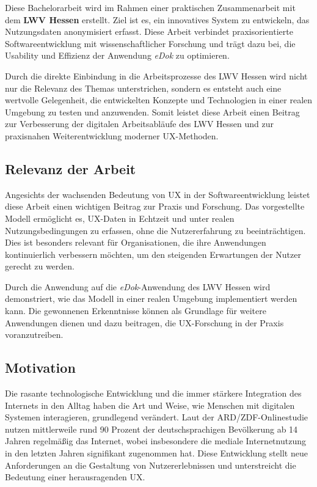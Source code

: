 \documentclass[12pt,oneside]{article}
\begin{document}
Diese Bachelorarbeit wird im Rahmen einer praktischen Zusammenarbeit mit dem \textbf{LWV Hessen} erstellt. Ziel ist es, ein innovatives System zu entwickeln, das Nutzungsdaten anonymisiert erfasst.
Diese Arbeit verbindet praxisorientierte Softwareentwicklung mit wissenschaftlicher Forschung und trägt dazu bei, die Usability und Effizienz der Anwendung \textit{eDok} zu optimieren.

Durch die direkte Einbindung in die Arbeitsprozesse des LWV Hessen wird nicht nur die Relevanz des Themas unterstrichen, sondern es entsteht auch eine wertvolle Gelegenheit, die entwickelten Konzepte und Technologien in einer realen Umgebung zu testen und anzuwenden. Somit leistet diese Arbeit einen Beitrag zur Verbesserung der digitalen Arbeitsabläufe des LWV Hessen und zur praxisnahen Weiterentwicklung moderner UX-Methoden.
\subsection{Relevanz der Arbeit}

Angesichts der wachsenden Bedeutung von UX in der Softwareentwicklung leistet diese Arbeit einen wichtigen Beitrag zur Praxis und Forschung. Das vorgestellte Modell ermöglicht es, UX-Daten in Echtzeit und unter realen Nutzungsbedingungen zu erfassen, ohne die Nutzererfahrung zu beeinträchtigen. Dies ist besonders relevant für Organisationen, die ihre Anwendungen kontinuierlich verbessern möchten, um den steigenden Erwartungen der Nutzer gerecht zu werden.

Durch die Anwendung auf die \textit{eDok}-Anwendung des LWV Hessen wird demonstriert, wie das Modell in einer realen Umgebung implementiert werden kann. Die gewonnenen Erkenntnisse können als Grundlage für weitere Anwendungen dienen und dazu beitragen, die UX-Forschung in der Praxis voranzutreiben.
\subsection{Motivation}

Die rasante technologische Entwicklung und die immer stärkere Integration des Internets in den Alltag haben die Art und Weise, wie Menschen mit digitalen Systemen interagieren, grundlegend verändert. Laut der ARD/ZDF-Onlinestudie \cite{ard} nutzen mittlerweile rund 90 Prozent der deutschsprachigen Bevölkerung ab 14 Jahren regelmäßig das Internet, wobei insbesondere die mediale Internetnutzung in den letzten Jahren signifikant zugenommen hat. Diese Entwicklung stellt neue Anforderungen an die Gestaltung von Nutzererlebnissen und unterstreicht die Bedeutung einer herausragenden UX.
\end{document}
